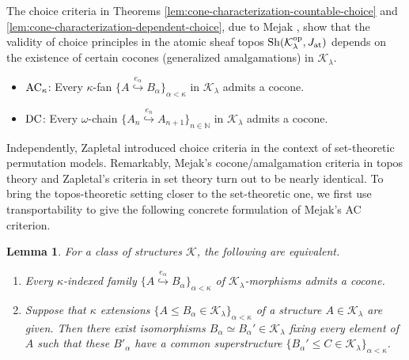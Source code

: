 \documentclass[10pt]{amsart}
\numberwithin{equation}{section}
\theoremstyle{plain}
\newtheorem{lemma}[theorem]{Lemma}
\theoremstyle{definition}
\newcommand{\N}{\mathbb{N}}
\newcommand{\om}{\omega}
\newcommand{\K}{\mathcal{K}}
\newcommand{\embed}{\hookrightarrow}
\newcommand{\embedge}[1]{\overset{#1}{\embed}}
\begin{document}
The choice criteria in Theorems \ref{lem:cone-characterization-countable-choice} and \ref{lem:cone-characterization-dependent-choice}, due to Mejak \cite{Mej19}, show that the validity of choice principles in the atomic sheaf topos ${\rm Sh}(\K^{\rm op}_\lambda,J_{\rm at})$ depends on the existence of certain cocones (generalized amalgamations) in $\K_\lambda$.
\begin{itemize}
\item ${\rm AC}_\kappa$: Every $\kappa$-fan $\{A\embedge{e_\alpha}B_\alpha\}_{\alpha<\kappa}$ in $\K_\lambda$ admits a cocone.
\item ${\rm DC}$: Every $\om$-chain $\{A_n\embedge{e_n}A_{n+1}\}_{n\in\N}$ in $\K_\lambda$ admits a cocone.
\end{itemize}

Independently, Zapletal \cite{Zap26} introduced choice criteria in the context of set-theoretic permutation models.
Remarkably, Mejak's cocone/amalgamation criteria in topos theory and Zapletal's criteria in set theory turn out to be nearly identical.
To bring the topos-theoretic setting closer to the set-theoretic one, we first use transportability to give the following concrete formulation of Mejak's AC criterion.

\begin{lemma}\label{lem:Mejak-AC-criterion}
For a class of structures $\K$, the following are equivalent.
\begin{enumerate}
\item Every $\kappa$-indexed family $\{A\embedge{e_\alpha}B_\alpha\}_{\alpha<\kappa}$ of $\K_\lambda$-morphisms admits a cocone.
\item Suppose that $\kappa$ extensions $\{A\leq B_\alpha\in\K_\lambda\}_{\alpha<\kappa}$ of a structure $A\in\K_\lambda$ are given.
Then there exist isomorphisms $B_\alpha\simeq B_\alpha'\in\K_\lambda$ fixing every element of $A$ such that these $B'_\alpha$ have a common superstructure $\{B_\alpha'\leq C\in\K_\lambda\}_{\alpha<\kappa}$.
\end{enumerate}
\end{lemma}
\end{document}
